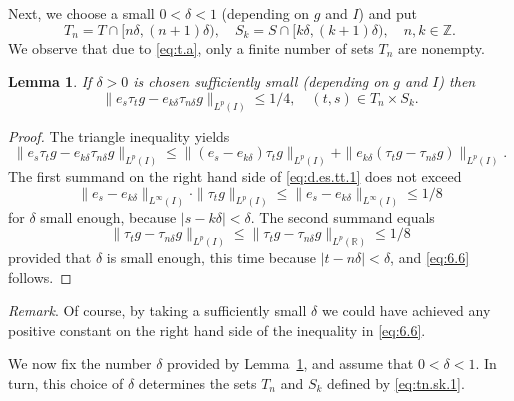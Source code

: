 \documentclass[reqno,a4paper,12pt]{amsart}
\numberwithin{equation}{section}
\numberwithin{figure}{section}
\newcommand\R{\mathbb{R}}
\newcommand\Z{\mathbb{Z}}
\newcommand\del{\delta}
\newcommand\1{\mathds{1}}
\newcommand{\TTT}{T}
\newcommand{\SSS}{S}
\newcommand{\ts}{\tau}
\renewcommand\le{\leqslant}
\theoremstyle{plain}
\newtheorem{lem}[thm]{Lemma}
\newcommand{\lemref}[1]{Lemma~\ref{#1}}
\theoremstyle{definition}
\begin{document}
Next, we choose a small $0 <\delta < 1$ (depending on $g$ and $I$) and put 
\begin{equation}
\label{eq:tn.sk.1}
\TTT_n = \TTT\cap [n\delta, (n+1)\delta), \quad
\SSS_k = \SSS\cap [k\delta, (k+1)\delta), \quad  n,k \in \Z.
\end{equation}
We observe that due to \eqref{eq:t.a},
 only a finite number of sets $\TTT_n$ are nonempty.


\begin{lem}
\label{lem:d.es.tt}
If $\delta > 0$ is chosen sufficiently small (depending on $g$ and $I$) then 
\begin{equation}
\label{eq:6.6}
\|e_s \ts_t g - e_{k\delta} \ts_{n\delta} g\|_{L^p(I)} \le 1/4,
\quad (t,s) \in \TTT_n \times \SSS_k.
\end{equation}
\end{lem}

\begin{proof}
The triangle inequality yields
\begin{equation}
\label{eq:d.es.tt.1}
\|e_s \ts_t g - e_{k\delta} \ts_{n\delta} g\|_{L^p(I)}
\le \|(e_s-e_{k\delta}) \ts_t g\|_{L^p(I)} 
+ \|e_{k\delta} (\ts_t g - \ts_{n\delta}g)\|_{L^p(I)}.
\end{equation}
The first summand on the right hand side of \eqref{eq:d.es.tt.1} does not exceed 
\begin{equation}
\|e_s-e_{k\delta}\|_{L^\infty(I)}\cdot \|\ts_t g\|_{L^p(I)}
\le 	\|e_s-e_{k\delta}\|_{L^\infty(I)} \le 1/8
\end{equation}
for $\delta $  small enough, 
because $|s-k\delta| < \delta$. The second summand equals 
\begin{equation}
\|\ts_t g - \ts_{n\delta}g\|_{L^p(I)}
\le \|\ts_t g - \ts_{n\delta}g\|_{L^p(\R)}  \le 1/8
\end{equation}
provided that
 $\delta $  is small enough, this time
because $|t-n\delta| < \delta$, and \eqref{eq:6.6} follows.
\end{proof}

\emph{Remark}. Of course, by taking a 
sufficiently small $\delta $ we could have achieved any 
positive constant on the right hand side of 
the inequality in \eqref{eq:6.6}.



We now fix the number $\delta $ provided by 
\lemref{lem:d.es.tt}, and assume that $0 < \delta < 1$.
In turn, this choice of $\del$ determines the sets
$\TTT_n$ and $\SSS_k$ defined by \eqref{eq:tn.sk.1}.
\end{document}
